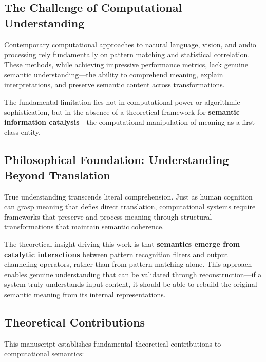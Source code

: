 \documentclass[12pt,a4paper,twoside]{article}
\begin{document}
\subsection{The Challenge of Computational Understanding}

Contemporary computational approaches to natural language, vision, and audio processing rely fundamentally on pattern matching and statistical correlation. These methods, while achieving impressive performance metrics, lack genuine semantic understanding—the ability to comprehend meaning, explain interpretations, and preserve semantic content across transformations.

The fundamental limitation lies not in computational power or algorithmic sophistication, but in the absence of a theoretical framework for \textbf{semantic information catalysis}—the computational manipulation of meaning as a first-class entity.

\subsection{Philosophical Foundation: Understanding Beyond Translation}

True understanding transcends literal comprehension. Just as human cognition can grasp meaning that defies direct translation, computational systems require frameworks that preserve and process meaning through structural transformations that maintain semantic coherence.

The theoretical insight driving this work is that \textbf{semantics emerge from catalytic interactions} between pattern recognition filters and output channeling operators, rather than from pattern matching alone. This approach enables genuine understanding that can be validated through reconstruction—if a system truly understands input content, it should be able to rebuild the original semantic meaning from its internal representations.

\subsection{Theoretical Contributions}

This manuscript establishes fundamental theoretical contributions to computational semantics:
\end{document}
